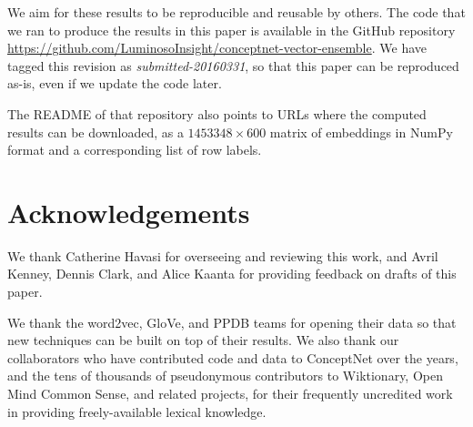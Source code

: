 \documentclass[11pt,letterpaper]{article}
\begin{document}
We aim for these results to be reproducible and reusable by others. The code
that we ran to produce the results in this paper is available in the GitHub
repository \url{https://github.com/LuminosoInsight/conceptnet-vector-ensemble}.
We have tagged this revision as {\em submitted-20160331}, so that this paper
can be reproduced as-is, even if we update the code later.

The README of that repository also points to URLs where the computed results
can be downloaded, as a $1453348 \times 600$ matrix of embeddings in NumPy
format and a corresponding list of row labels.

\section*{Acknowledgements}

We thank Catherine Havasi for overseeing and reviewing this work, and Avril Kenney,
Dennis Clark, and Alice Kaanta for providing feedback on drafts of this paper.

We thank the word2vec, GloVe, and PPDB teams for opening their data so that new
techniques can be built on top of their results. We also thank our
collaborators who have contributed code and data to ConceptNet over the years,
and the tens of thousands of pseudonymous contributors to Wiktionary, Open Mind
Common Sense, and related projects, for their frequently uncredited work in
providing freely-available lexical knowledge.

\begin{CJK*}{UTF8}{min}

\end{CJK*}
\end{document}
